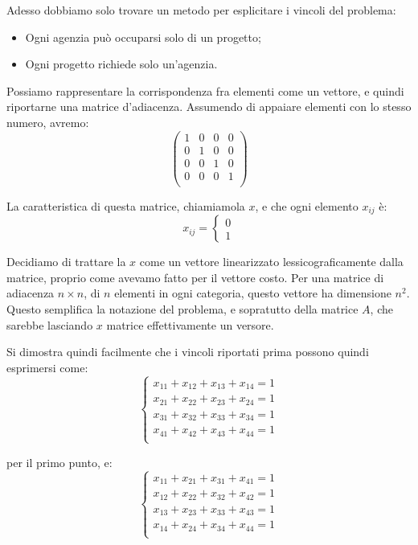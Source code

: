 \documentclass[a4paper,11pt]{article}
\begin{document}
Adesso dobbiamo solo trovare un metodo per esplicitare i vincoli del problema:
\begin{itemize}
	\item Ogni agenzia può occuparsi solo di un progetto;
	\item Ogni progetto richiede solo un'agenzia.
\end{itemize}

Possiamo rappresentare la corrispondenza fra elementi come un vettore, e quindi riportarne una matrice d'adiacenza.
Assumendo di appaiare elementi con lo stesso numero, avremo:
$$
\begin{pmatrix}
	1 & 0 & 0 & 0 \\ 
	0 & 1 & 0 & 0 \\ 
	0 & 0 & 1 & 0 \\ 
	0 & 0 & 0 & 1 \\ 
\end{pmatrix}
$$

La caratteristica di questa matrice, chiamiamola $x$, e che ogni elemento $x_{ij}$ è:
$$
x_{ij} = 
	\begin{cases}
		0 \\ 1	
	\end{cases}
$$

Decidiamo di trattare la $x$ come un vettore linearizzato lessicograficamente dalla matrice, proprio come avevamo fatto per il vettore costo.
Per una matrice di adiacenza $n \times n$, di $n$ elementi in ogni categoria, questo vettore ha dimensione $n^2$. 
Questo semplifica la notazione del problema, e sopratutto della matrice $A$, che sarebbe lasciando $x$ matrice effettivamente un versore.

Si dimostra quindi facilmente che i vincoli riportati prima possono quindi esprimersi come:
\[
	\begin{cases}
		x_{11} + x_{12} + x_{13} + x_{14} = 1	\\
		x_{21} + x_{22} + x_{23} + x_{24} = 1 \\ 
		x_{31} + x_{32} + x_{33} + x_{34} = 1 \\ 
		x_{41} + x_{42} + x_{43} + x_{44} = 1 \\ 
	\end{cases}
\]

per il primo punto, e:
\[
	\begin{cases}
		x_{11} + x_{21} + x_{31} + x_{41} = 1	\\
		x_{12} + x_{22} + x_{32} + x_{42} = 1 \\ 
		x_{13} + x_{23} + x_{33} + x_{43} = 1 \\ 
		x_{14} + x_{24} + x_{34} + x_{44} = 1 \\ 
	\end{cases}
\]
\end{document}

